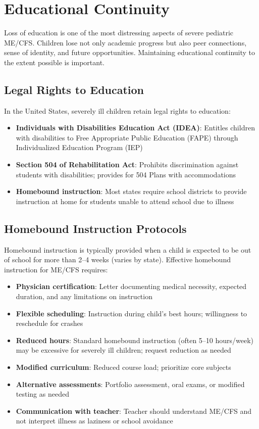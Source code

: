 \section{Educational Continuity}
\label{sec:ped-severe-education}

Loss of education is one of the most distressing aspects of severe pediatric ME/CFS. Children lose not only academic progress but also peer connections, sense of identity, and future opportunities. Maintaining educational continuity to the extent possible is important.

\subsection{Legal Rights to Education}

In the United States, severely ill children retain legal rights to education:

\begin{itemize}
    \item \textbf{Individuals with Disabilities Education Act (IDEA)}: Entitles children with disabilities to Free Appropriate Public Education (FAPE) through Individualized Education Program (IEP)
    \item \textbf{Section 504 of Rehabilitation Act}: Prohibits discrimination against students with disabilities; provides for 504 Plans with accommodations
    \item \textbf{Homebound instruction}: Most states require school districts to provide instruction at home for students unable to attend school due to illness
\end{itemize}

\subsection{Homebound Instruction Protocols}

Homebound instruction is typically provided when a child is expected to be out of school for more than 2--4 weeks (varies by state). Effective homebound instruction for ME/CFS requires:

\begin{itemize}
    \item \textbf{Physician certification}: Letter documenting medical necessity, expected duration, and any limitations on instruction
    \item \textbf{Flexible scheduling}: Instruction during child's best hours; willingness to reschedule for crashes
    \item \textbf{Reduced hours}: Standard homebound instruction (often 5--10 hours/week) may be excessive for severely ill children; request reduction as needed
    \item \textbf{Modified curriculum}: Reduced course load; prioritize core subjects
    \item \textbf{Alternative assessments}: Portfolio assessment, oral exams, or modified testing as needed
    \item \textbf{Communication with teacher}: Teacher should understand ME/CFS and not interpret illness as laziness or school avoidance
\end{itemize}

